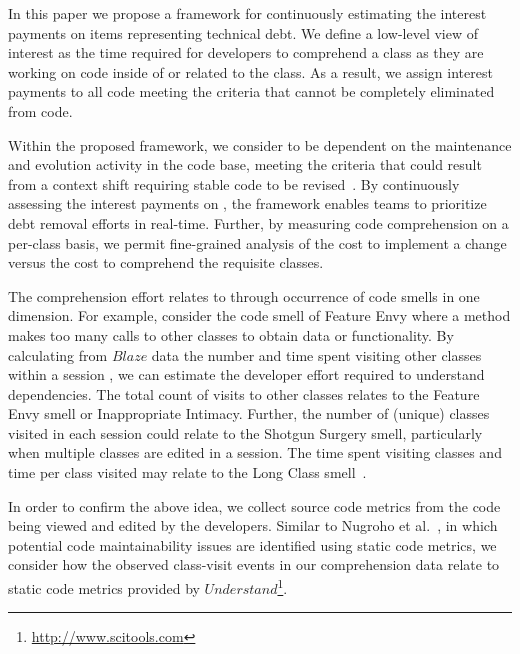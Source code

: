 
In this paper we propose a framework for continuously estimating the interest payments on items representing technical debt. We define a low-level view of interest as the time required for developers to comprehend a class as they are working on code inside of or related to the class. As a result, we assign interest payments to all code meeting the criteria that \TD cannot be completely eliminated from code. 

Within the proposed framework, we consider \TD to be dependent on the maintenance and evolution activity in the code base, meeting the criteria that \TD could result from a context shift requiring stable code to be revised~\cite{Ozkaya_etal:2012}.  By continuously assessing the interest payments on \TD, the framework enables teams to prioritize debt removal efforts in real-time.  Further, by measuring code comprehension on a per-class basis, we permit fine-grained analysis of the cost to implement a change versus the cost to comprehend the requisite classes. 

The comprehension effort relates to \TD through occurrence of code smells in one dimension.  For example, consider the code smell of Feature Envy where a method makes too many calls to other classes to obtain data or functionality.  By calculating from $Blaze$ data the number  and time spent visiting other classes within a session , we can estimate the developer effort required to understand dependencies.  The total count of visits to other classes relates to the Feature Envy smell or Inappropriate Intimacy. Further, the number of (unique) classes visited in each session could  relate to the Shotgun Surgery smell, particularly when multiple classes are edited in a session. The time spent visiting classes and time per class visited may relate to the Long Class smell~\cite{Fowler_etal:1999}.  

In order to confirm the above idea, we collect source code metrics from the code being viewed and edited by the developers.  Similar to Nugroho et al.~\cite{Nugroho_etal:2011}, in which potential code maintainability issues are identified using static code metrics, we consider how the observed class-visit events in our comprehension data relate to static code metrics provided by $Understand$\footnote{\url{http://www.scitools.com}}.